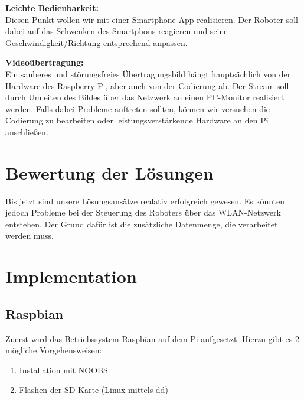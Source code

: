 \documentclass[12pt]{article}
\begin{document}
{\bf Leichte Bedienbarkeit:}\\
Diesen Punkt wollen wir mit einer Smartphone App realisieren. Der Roboter soll dabei auf das Schwenken des Smartphons reagieren und seine Geschwindigkeit/Richtung entsprechend anpassen.

\vspace{0,6cm}

{\bf Videoübertragung:}\\
Ein sauberes und störungsfreies Übertragungsbild hängt hauptsächlich von der Hardware des Raspberry Pi, aber auch von der Codierung ab. Der Stream soll durch  Umleiten des Bildes über das Netzwerk an einen PC-Monitor realisiert werden. Falls dabei Probleme auftreten sollten, können wir versuchen die Codierung zu bearbeiten oder leistungsverstärkende Hardware an den Pi anschließen.




\section{Bewertung der Lösungen}

Bis jetzt sind unsere Lösungsansätze realativ erfolgreich gewesen. Es könnten jedoch Probleme bei der Steuerung des Roboters über das WLAN-Netzwerk entstehen. Der Grund dafür ist die zusätzliche Datenmenge, die verarbeitet werden muss.

\section{Implementation}

\subsection{Raspbian}

Zuerst wird das Betriebssystem Raspbian auf dem Pi aufgesetzt.
Hierzu gibt es 2 mögliche Vorgehensweisen:
\begin{enumerate}
\item Installation mit NOOBS
\item Flashen der SD-Karte (Linux mittels dd)
\end{enumerate}
\end{document}

